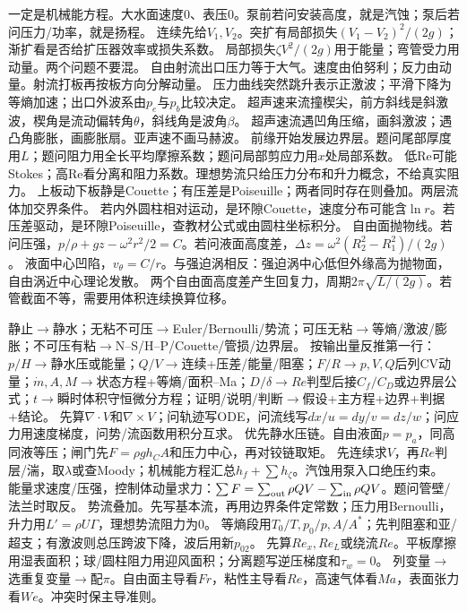 一定是机械能方程。大水面速度0、表压0。泵前若问安装高度，就是汽蚀；泵后若问压力/功率，就是扬程。
连续先给$V_1,V_2$。突扩有局部损失$(V_1-V_2)^2/(2g)$；渐扩看是否给扩压器效率或损失系数。
局部损失$\zeta V^2/(2g)$用于能量；弯管受力用动量。两个问题不要混。
自由射流出口压力等于大气。速度由伯努利；反力由动量。射流打板再按板方向分解动量。
压力曲线突然跳升表示正激波；平滑下降为等熵加速；出口外波系由$p_e$与$p_b$比较决定。
超声速来流撞楔尖，前方斜线是斜激波，楔角是流动偏转角$\theta$，斜线角是波角$\beta$。
超声速流遇凹角压缩，画斜激波；遇凸角膨胀，画膨胀扇。亚声速不画马赫波。
前缘开始发展边界层。题问尾部厚度用$L$；题问阻力用全长平均摩擦系数；题问局部剪应力用$x$处局部系数。
低Re可能Stokes；高Re看分离和阻力系数。理想势流只给压力分布和升力概念，不给真实阻力。
上板动下板静是Couette；有压差是Poiseuille；两者同时存在则叠加。两层流体加交界条件。
若内外圆柱相对运动，是环隙Couette，速度分布可能含$\ln r$。若压差驱动，是环隙Poiseuille，查教材公式或由圆柱坐标积分。
自由面抛物线。若问压强，$p/\rho+gz-\omega^2r^2/2=C$。若问液面高度差，$\Delta z=\omega^2(R_2^2-R_1^2)/(2g)$。
液面中心凹陷，$v_\theta=C/r$。与强迫涡相反：强迫涡中心低但外缘高为抛物面，自由涡近中心理论发散。
两个自由面高度差产生回复力，周期$2\pi\sqrt{L/(2g)}$。若管截面不等，需要用体积连续换算位移。

静止$\to$静水；无粘不可压$\to$Euler/Bernoulli/势流；可压无粘$\to$等熵/激波/膨胀；不可压有粘$\to$N--S/H--P/Couette/管损/边界层。
按输出量反推第一行：$p/H\to$静水压或能量；$Q/V\to$连续+压差/能量/阻塞；$F/R\to p,V,Q$后列CV动量；$\dot m,A,M\to$状态方程+等熵/面积--Ma；$D/\delta\to Re$判型后接$C_f/C_D$或边界层公式；$t\to$瞬时体积守恒微分方程；证明/说明/判断$\to$假设+主方程+边界+判据+结论。
先算$\nabla\cdot V$和$\nabla\times V$；问轨迹写ODE，问流线写$dx/u=dy/v=dz/w$；问应力用速度梯度，问势/流函数用积分互求。
优先静水压链。自由液面$p=p_a$，同高同液等压；闸门先$F=\rho gh_CA$和压力中心，再对铰链取矩。
先连续求$V$，再$Re$判层/湍，取$\lambda$或查Moody；机械能方程汇总$h_f+\sum h_\zeta$。汽蚀用泵入口绝压约束。
能量求速度/压强，控制体动量求力：$\sum F=\sum_{\rm out}\rho QV-\sum_{\rm in}\rho QV$。题问管壁/法兰时取反。
势流叠加。先写基本流，再用边界条件定常数；压力用Bernoulli，升力用$L'=\rho U\Gamma$，理想势流阻力为0。
等熵段用$T_0/T,p_0/p,A/A^*$；先判阻塞和亚/超支；有激波则总压跨波下降，波后用新$p_{02}$。
先算$Re_x,Re_L$或绕流$Re$。平板摩擦用湿表面积；球/圆柱阻力用迎风面积；分离题写逆压梯度和$\tau_w=0$。
列变量$\to$选重复变量$\to$配$\pi$。自由面主导看$Fr$，粘性主导看$Re$，高速气体看$Ma$，表面张力看$We$。冲突时保主导准则。

